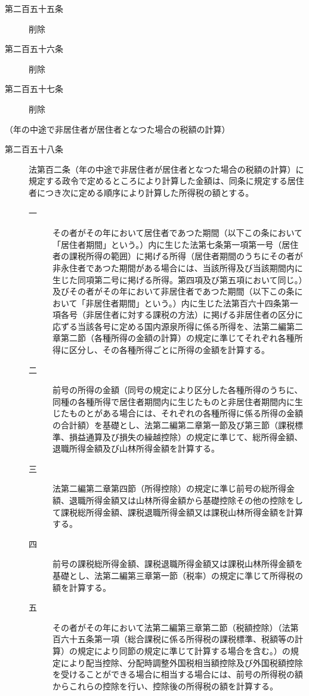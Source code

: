 \documentclass[twocolumn,a4j,10pt]{ltjtarticle}
\begin{document}
\begin{description}
\item[第二百五十五条]削除
\end{description}
\begin{description}
\item[第二百五十六条]削除
\end{description}
\begin{description}
\item[第二百五十七条]削除
\end{description}
\noindent\hspace{10pt}（年の中途で非居住者が居住者となつた場合の税額の計算）
\begin{description}
\item[第二百五十八条]法第百二条（年の中途で非居住者が居住者となつた場合の税額の計算）に規定する政令で定めるところにより計算した金額は、同条に規定する居住者につき次に定める順序により計算した所得税の額とする。
\begin{description}
\item[一]その者がその年において居住者であつた期間（以下この条において「居住者期間」という。）内に生じた法第七条第一項第一号（居住者の課税所得の範囲）に掲げる所得（居住者期間のうちにその者が非永住者であつた期間がある場合には、当該所得及び当該期間内に生じた同項第二号に掲げる所得。第四項及び第五項において同じ。）及びその者がその年において非居住者であつた期間（以下この条において「非居住者期間」という。）内に生じた法第百六十四条第一項各号（非居住者に対する課税の方法）に掲げる非居住者の区分に応ずる当該各号に定める国内源泉所得に係る所得を、法第二編第二章第二節（各種所得の金額の計算）の規定に準じてそれぞれ各種所得に区分し、その各種所得ごとに所得の金額を計算する。
\item[二]前号の所得の金額（同号の規定により区分した各種所得のうちに、同種の各種所得で居住者期間内に生じたものと非居住者期間内に生じたものとがある場合には、それぞれの各種所得に係る所得の金額の合計額）を基礎とし、法第二編第二章第一節及び第三節（課税標準、損益通算及び損失の繰越控除）の規定に準じて、総所得金額、退職所得金額及び山林所得金額を計算する。
\item[三]法第二編第二章第四節（所得控除）の規定に準じ前号の総所得金額、退職所得金額又は山林所得金額から基礎控除その他の控除をして課税総所得金額、課税退職所得金額又は課税山林所得金額を計算する。
\item[四]前号の課税総所得金額、課税退職所得金額又は課税山林所得金額を基礎とし、法第二編第三章第一節（税率）の規定に準じて所得税の額を計算する。
\item[五]その者がその年において法第二編第三章第二節（税額控除）（法第百六十五条第一項（総合課税に係る所得税の課税標準、税額等の計算）の規定により同節の規定に準じて計算する場合を含む。）の規定により配当控除、分配時調整外国税相当額控除及び外国税額控除を受けることができる場合に相当する場合には、前号の所得税の額からこれらの控除を行い、控除後の所得税の額を計算する。

\end{description}
\end{description}
\end{document}
